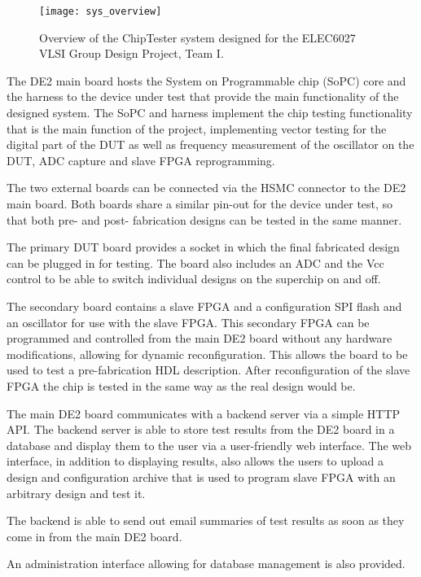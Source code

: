 \begin{figure}[h!]
\centering
\texttt{[image: sys\_overview]}
\caption{Overview of the ChipTester system designed for the ELEC6027 VLSI Group Design Project, Team I.}
\label{fig:intro_sys_overview}
\end{figure}


The DE2 main board hosts the System on Programmable chip (SoPC) core and the harness to
the device under test that provide the main functionality of
the designed system. The SoPC and harness implement
the chip testing functionality that is the main function of the project, implementing
vector testing for the digital part of the DUT as well as frequency measurement of
the oscillator on the DUT, ADC capture and slave FPGA reprogramming.

The two external boards can be connected via the HSMC connector to the DE2 main board.
Both boards share a similar pin-out for the device under test, so that both pre- and post-
fabrication designs can be tested in the same manner.

The primary DUT board provides a socket in which the final fabricated design can
be plugged in for testing. The board also includes an ADC and the Vcc control to be
able to switch individual designs on the superchip on and off.

The secondary board contains a slave FPGA and a configuration SPI flash and an oscillator for
use with the slave FPGA. This secondary FPGA can be programmed and controlled from the
main DE2 board without any hardware modifications, allowing for dynamic reconfiguration.
This allows the board to be used to test a pre-fabrication HDL description.
After reconfiguration of the slave FPGA the chip is tested in the same way as the real
design would be.

The main DE2 board communicates with a backend server via a simple HTTP API. The
backend server is able to store test results from the DE2 board in a database and
display them to the user via a user-friendly web interface. The web interface,
in addition to displaying results, also allows the users to upload a design and configuration
archive that is used to program slave FPGA with an arbitrary design and test it.

The backend is able to send out email summaries of test results as soon as they
come in from the main DE2 board.

An administration interface allowing for database management is also provided.











